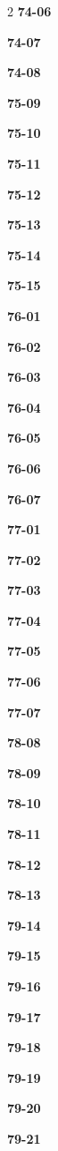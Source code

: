 \documentclass[10pt,a4paper]{article}
\begin{document}
\begin{multicols}{2}
\noindent\textbf{74-06}\ \par
\noindent\textbf{74-07}\ \par
\noindent\textbf{74-08}\ \par
\noindent\textbf{75-09}\ \par
\noindent\textbf{75-10}\ \par
\noindent\textbf{75-11}\ \par
\noindent\textbf{75-12}\ \par
\noindent\textbf{75-13}\ \par
\noindent\textbf{75-14}\ \par
\noindent\textbf{75-15}\ \par
\noindent\textbf{76-01}\ \par
\noindent\textbf{76-02}\ \par
\noindent\textbf{76-03}\ \par
\noindent\textbf{76-04}\ \par
\noindent\textbf{76-05}\ \par
\noindent\textbf{76-06}\ \par
\noindent\textbf{76-07}\ \par
\noindent\textbf{77-01}\ \par
\noindent\textbf{77-02}\ \par
\noindent\textbf{77-03}\ \par
\noindent\textbf{77-04}\ \par
\noindent\textbf{77-05}\ \par
\noindent\textbf{77-06}\ \par
\noindent\textbf{77-07}\ \par
\noindent\textbf{78-08}\ \par
\noindent\textbf{78-09}\ \par
\noindent\textbf{78-10}\ \par
\noindent\textbf{78-11}\ \par
\noindent\textbf{78-12}\ \par
\noindent\textbf{78-13}\ \par
\noindent\textbf{79-14}\ \par
\noindent\textbf{79-15}\ \par
\noindent\textbf{79-16}\ \par
\noindent\textbf{79-17}\ \par
\noindent\textbf{79-18}\ \par
\noindent\textbf{79-19}\ \par
\noindent\textbf{79-20}\ \par
\noindent\textbf{79-21}\ \par

\end{multicols}
\end{document}
